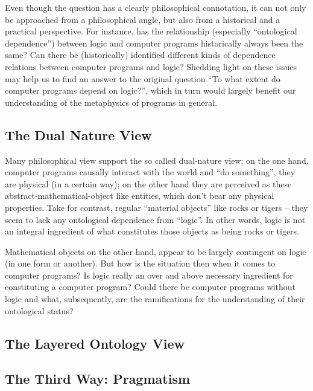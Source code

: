 \documentclass[]{article}
\begin{document}
Even though the question has a clearly philosophical connotation, it can
not only be approached from a philosophical angle, but also from a historical
and a practical perspective. For instance, has the relationship (especially
“ontological dependence”) between logic and computer programs historically
always been the same? Can there be (historically) identified different kinds of
dependence relations between computer programs and logic? Shedding light
on these issues may help us to find an answer to the original question “To
what extent do computer programs depend on logic?”, which in turn would
largely benefit our understanding of the metaphysics of programs in general.


\subsection{The Dual Nature View}

Many philosophical view support the so called dual-nature view; on the one hand, computer programs causally interact with the world and “do something”, they are physical (in a certain way); on the other hand they are perceived as these abstract-mathematical-object like entities, which don't bear any physical properties.
Take for contrast, regular “material objects” like rocks or tigers -- they
seem to lack any ontological dependence from “logic”. In other words, logic is
not an integral ingredient of what constitutes those objects as being rocks or
tigers.

Mathematical objects on the other hand, appear to be largely contingent on logic (in one form or another). But how is the situation then when it comes to computer programs? Is logic really an over and above necessary ingredient for constituting a computer program? Could there be computer programs without logic and what, subsequently, are the ramifications for the understanding of their ontological status?

\subsection{The Layered Ontology View}


{\color{red}{this passage follows on Nicola's and Giuseppe's work for SEP}}

\subsection{The Third Way: Pragmatism}
\end{document}
